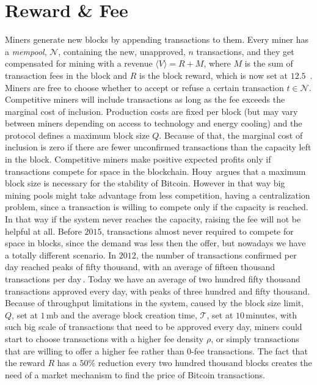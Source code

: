 \documentclass[USenglish]{uit-thesis}
\def\bitcoinA{%
	\leavevmode
	\vtop{\offinterlineskip %
		\setbox0=\hbox{B}%
		\setbox2=\hbox to\wd0{\hfil\hskip-.03em
			\vrule height .3ex width .15ex\hskip .08em
			\vrule height .3ex width .15ex\hfil}
		\vbox{\copy2\box0}\box2}}
\begin{document}
\section{Reward \& Fee}
\label{sec:bitcoinfee}
Miners generate new blocks by appending
transactions to them. Every miner has a \emph{mempool}, $\mathcal{N}$,
containing the new, unapproved, $n$ transactions, and they
get compensated for mining with a revenue $\langle V \rangle = R + M$,
where $M$ is the sum of transaction fees in the block and
$R$ is the block reward, which is now set at $12.5$\,\bitcoinA.
Miners are free to choose
whether to accept or refuse a certain transaction $t\in\mathcal{N}$.
Competitive miners will include transactions as long as the fee exceeds
the marginal cost of inclusion. Production costs are fixed
per block (but may vary between miners depending on access to
technology and energy cooling) and the protocol
defines a maximum block size $Q$.
Because of that, the marginal cost of inclusion is zero if there are
fewer unconfirmed transactions than the capacity left in the block.
Competitive miners make positive expected profits only if transactions
compete for space in the blockchain. Houy\,\cite{houy2014EOBTF}
argues that a maximum block size is necessary for the stability of Bitcoin.
However in that way big mining pools might take advantage from less competition,
having a centralization problem, since a transaction is willing to
compete only if the capacity is reached.
In that way if the system never reaches the capacity, raising the fee
will not be helpful at all. Before $2015$, transactions almost
never required to compete for space in blocks, since the demand
was less then the offer, but nowadays we have a totally different
scenario. 
In $2012$, the number of transactions confirmed per day
reached peaks of fifty thousand, with an average of
fifteen thousand transactions per day\,\cite{bitcoin_blockchain}.
Today we have an average of two hundred fifty thousand
transactions approved every day, with peaks of three hundred
and fifty thousand.
Because of throughput
limitations in the system, caused by the block size limit, $Q$,
set at $1$\,\gls{mb}
and the average block creation
time, $\mathcal{T}$,
set at $10$\,minutes, with
such big scale of transactions
that need to be approved every day,
miners could start to choose transactions with a higher
fee density $\rho$, or simply transactions
that are willing to offer a higher fee
rather than $0$-fee transactions.
The fact that the reward $R$ has a $50\%$ reduction every
two hundred thousand blocks creates the need of a market
mechanism to find the price
of Bitcoin transactions.
\end{document}
